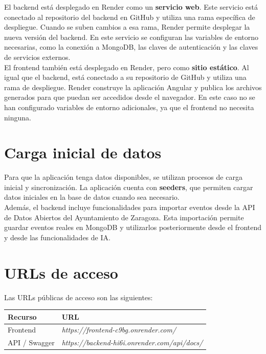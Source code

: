 \documentclass[12pt,a4paper]{article}
\begin{document}
\noindent
El backend está desplegado en Render como un \textbf{servicio web}. Este servicio está
conectado al repositorio del backend en GitHub y utiliza una rama específica de
despliegue. Cuando se suben cambios a esa rama, Render permite desplegar la nueva
versión del backend. En este servicio se configuran las variables de entorno necesarias,
como la conexión a MongoDB, las claves de autenticación y las claves de servicios
externos. \\

\noindent
El frontend también está desplegado en Render, pero como \textbf{sitio estático}. Al
igual que el backend, está conectado a su repositorio de GitHub y utiliza una rama de
despliegue. Render construye la aplicación Angular y publica los archivos generados
para que puedan ser accedidos desde el navegador. En este caso no se han configurado
variables de entorno adicionales, ya que el frontend no necesita ninguna. \\

\section{Carga inicial de datos} 

\noindent
Para que la aplicación tenga datos disponibles, se utilizan procesos de carga inicial y
sincronización. La aplicación cuenta con \textbf{seeders}, que permiten cargar datos
iniciales en la base de datos cuando sea necesario. \\

\noindent
Además, el backend incluye funcionalidades para importar eventos desde la API de Datos
Abiertos del Ayuntamiento de Zaragoza. Esta importación permite guardar eventos reales
en MongoDB y utilizarlos posteriormente desde el frontend y desde las funcionalidades
de IA.

\section{URLs de acceso}

Las URLs públicas de acceso son las siguientes:

\begin{center}
\begin{tabular}{ll}
  \toprule
  \textbf{Recurso} & \textbf{URL} \\
  \midrule
  Frontend & \textit{https://frontend-c9bg.onrender.com/} \\
  API / Swagger & \textit{https://backend-hi6i.onrender.com/api/docs/} \\
  \bottomrule
\end{tabular}
\end{center}
\end{document}
